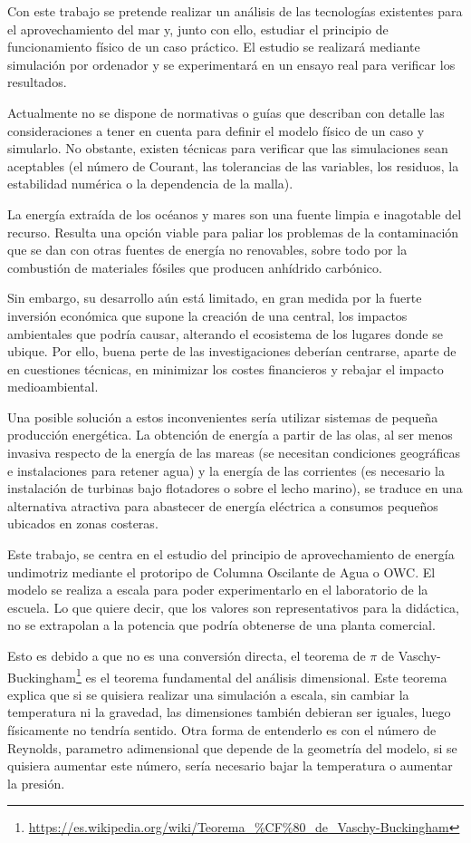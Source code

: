 Con este trabajo se pretende realizar un análisis de las tecnologías
existentes para el aprovechamiento del mar y, junto con ello, estudiar
el principio de funcionamiento físico de un caso práctico. El estudio se
realizará mediante simulación por ordenador y se experimentará en un
ensayo real para verificar los resultados.

Actualmente no se dispone de normativas o guías que describan con
detalle las consideraciones a tener en cuenta para definir el modelo
físico de un caso y simularlo. No obstante, existen técnicas para
verificar que las simulaciones sean aceptables (el número de Courant,
las tolerancias de las variables, los residuos, la estabilidad numérica
o la dependencia de la malla).

La energía extraída de los océanos y mares son una fuente limpia e
inagotable del recurso. Resulta una opción viable para paliar los
problemas de la contaminación que se dan con otras fuentes de energía no
renovables, sobre todo por la combustión de materiales fósiles que
producen anhídrido carbónico.

Sin embargo, su desarrollo aún está limitado, en gran medida por la
fuerte inversión económica que supone la creación de una central, los
impactos ambientales que podría causar, alterando el ecosistema de los
lugares donde se ubique. Por ello, buena perte de las investigaciones
deberían centrarse, aparte de en cuestiones técnicas, en minimizar los
costes financieros y rebajar el impacto medioambiental.

Una posible solución a estos inconvenientes sería utilizar sistemas de
pequeña producción energética. La obtención de energía a partir de las
olas, al ser menos invasiva respecto de la energía de las mareas (se
necesitan condiciones geográficas e instalaciones para retener agua) y
la energía de las corrientes (es necesario la instalación de turbinas
bajo flotadores o sobre el lecho marino), se traduce en una alternativa
atractiva para abastecer de energía eléctrica a consumos pequeños
ubicados en zonas costeras.

Este trabajo, se centra en el estudio del principio de aprovechamiento
de energía undimotriz mediante el protoripo de Columna Oscilante de Agua
o OWC. El modelo se realiza a escala
para poder experimentarlo en el laboratorio de la escuela. Lo que quiere
decir, que los valores son representativos para la didáctica, no se
extrapolan a la potencia que podría obtenerse de una planta comercial.

Esto es debido a que no es una conversión directa, el teorema
de $\pi$ de Vaschy-Buckingham\footnote{\url{https://es.wikipedia.org/wiki/Teorema_\%CF\%80_de_Vaschy-Buckingham}}
es el teorema fundamental del análisis
dimensional. Este teorema explica que si se quisiera realizar una
simulación a escala, sin cambiar la temperatura ni la gravedad, las
dimensiones también debieran ser iguales, luego físicamente no tendría
sentido. Otra forma de entenderlo es con el número de Reynolds,
parametro adimensional que depende de la geometría del modelo, si se
quisiera aumentar este número, sería necesario bajar la temperatura o
aumentar la presión.

